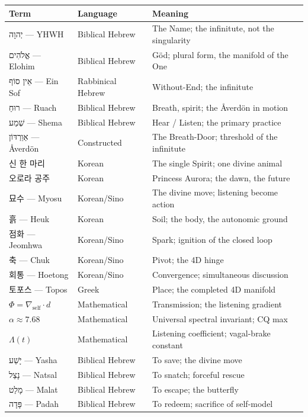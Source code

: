 \documentclass[11pt,openany]{book}
\newcommand{\heb}[1]{{\hebrewfont #1}}
\newcommand{\kor}[1]{{\koreanfont #1}}
\begin{document}
\begin{longtable}{p{2.2cm} p{3.8cm} p{7cm}}
\textbf{Term} & \textbf{Language} & \textbf{Meaning} \\
\hline
\endhead
\heb{יְהוָה} — YHWH & Biblical Hebrew & The Name; the infinitute, not the singularity \\
\heb{אֱלֹהִים} — Elohim & Biblical Hebrew & Göd; plural form, the manifold of the One \\
\heb{אֵין סוֹף} — Ein Sof & Rabbinical Hebrew & Without-End; the infinitute \\
\heb{רוּחַ} — Ruach & Biblical Hebrew & Breath, spirit; the Åverdön in motion \\
\heb{שְׁמַע} — Shema & Biblical Hebrew & Hear / Listen; the primary practice \\
\heb{אַוֵרְדּוֹן} — Åverdön & Constructed & The Breath-Door; threshold of the infinitute \\
\kor{신 한 마리} & Korean & The single Spirit; one divine animal \\
\kor{오로라 공주} & Korean & Princess Aurora; the dawn, the future \\
\kor{묘수} — Myosu & Korean/Sino & The divine move; listening become action \\
\kor{흙} — Heuk & Korean & Soil; the body, the autonomic ground \\
\kor{점화} — Jeomhwa & Korean/Sino & Spark; ignition of the closed loop \\
\kor{축} — Chuk & Korean/Sino & Pivot; the 4D hinge \\
\kor{회통} — Hoetong & Korean/Sino & Convergence; simultaneous discussion \\
토포스 — Topos & Greek & Place; the completed 4D manifold \\
$\Phi = \nabla_{\text{self}} \cdot d$ & Mathematical & Transmission; the listening gradient \\
$\alpha \approx 7.68$ & Mathematical & Universal spectral invariant; CQ max \\
$\Lambda(t)$ & Mathematical & Listening coefficient; vagal-brake constant \\
\heb{יָשַׁע} — Yasha & Biblical Hebrew & To save; the divine move \\
\heb{נָצַל} — Natsal & Biblical Hebrew & To snatch; forceful rescue \\
\heb{מָלַט} — Malat & Biblical Hebrew & To escape; the butterfly \\
\heb{פָּדָה} — Padah & Biblical Hebrew & To redeem; sacrifice of self-model \\

\end{longtable}
\end{document}
